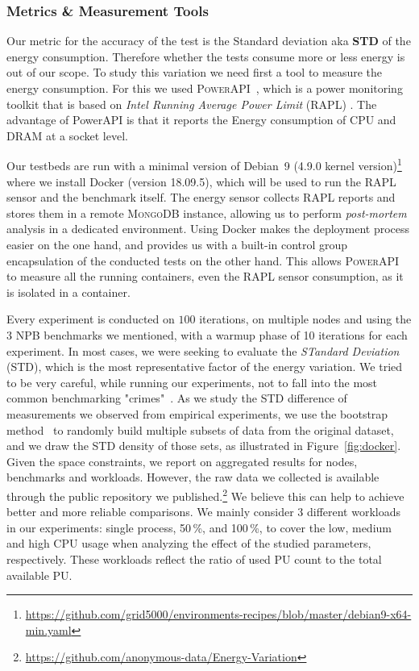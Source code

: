 \subsubsection{Metrics \& Measurement Tools}
Our metric for the accuracy of the test is the Standard deviation aka \textbf{STD} of the energy consumption. Therefore whether the tests consume more or less energy is out of our scope.
To study this variation we need first a tool to measure the energy consumption. For this we used \textsc{PowerAPI}~\cite{DBLP:journals/jss/ColmantRKSFS18}, which is a power monitoring toolkit that is based on \emph{Intel Running Average Power Limit} (RAPL) \cite{Khan:2018:RAE:3199681.3177754}. The advantage of PowerAPI is that it reports the Energy consumption of CPU and DRAM at a socket level.

Our testbeds are run with a minimal version of Debian \,9 (4.9.0 kernel version)\footnote{\url{https://github.com/grid5000/environments-recipes/blob/master/debian9-x64-min.yaml}} where we install Docker (version 18.09.5), which will be used to run the RAPL sensor and the benchmark itself.
The energy sensor collects RAPL reports and stores them in a remote \textsc{MongoDB} instance, allowing us to perform \emph{post-mortem} analysis in a dedicated environment.
Using Docker makes the deployment process easier on the one hand, and provides us with a built-in control group encapsulation of the conducted tests on the other hand.
This allows \textsc{PowerAPI} to measure all the running containers, even the RAPL sensor consumption, as it is isolated in a container.

Every experiment is conducted on $100$ iterations, on multiple nodes and using the 3 NPB benchmarks we mentioned, with a warmup phase of 10 iterations for each experiment.
In most cases, we were seeking to evaluate the \emph{STandard Deviation} (STD), which is the most representative factor of the energy variation.
We tried to be very careful, while running our experiments, not to fall into the most common benchmarking "crimes"~\cite{DBLP:journals/corr/abs-1801-02381}.
As we study the STD difference of measurements we observed from empirical experiments, we use the bootstrap method~\cite{efron2000bootstrap} to randomly build multiple subsets of data from the original dataset, and we draw the STD density of those sets, as illustrated in Figure~\ref{fig:docker}.
Given the space constraints, we report on aggregated results for nodes, benchmarks and workloads.
However, the raw data we collected is available through the public repository we published.\footnote{\url{https://github.com/anonymous-data/Energy-Variation}}
We believe this can help to achieve better and more reliable comparisons.
We mainly consider 3 different workloads in our experiments: \textsf{single process}, 50\,\%, and 100\,\%, to cover the low, medium and high CPU usage when analyzing the effect of the studied parameters, respectively.
These workloads reflect the ratio of used PU count to the total available PU.

